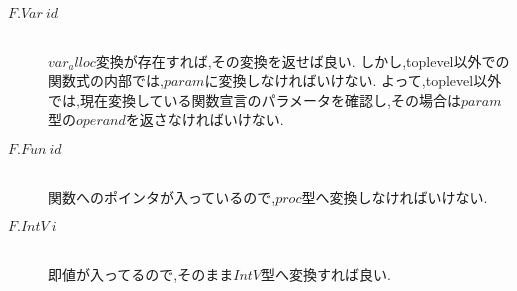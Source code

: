\begin{description}

\item[$F.Var\ id$] \hfill \\
$var_alloc$変換が存在すれば,その変換を返せば良い.
しかし,toplevel以外での関数式の内部では,$param$に変換しなければいけない.
よって,toplevel以外では,現在変換している関数宣言のパラメータを確認し,その場合は$param$型の$operand$を返さなければいけない.

\item[$F.Fun\ id$] \hfill \\
関数へのポインタが入っているので,$proc$型へ変換しなければいけない.

\item[$F.IntV\ i$] \hfill \\
即値が入ってるので,そのまま$IntV$型へ変換すれば良い.

\end{description}


